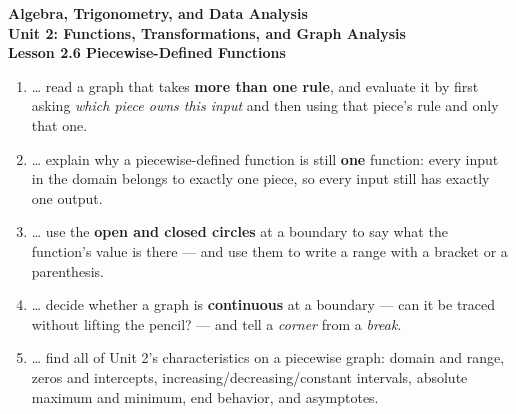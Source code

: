 \documentclass[10pt]{article}
\begin{document}
\vspace{-0.8in}

\begin{center}
  {\color{white}\textbf{\LARGE Algebra, Trigonometry, and Data Analysis}}\\[4pt]
  {\color{mistmid}\large\textbf{Unit 2: Functions, Transformations, and Graph Analysis}}\\[6pt]
  {\color{white}\textbf{\large Lesson 2.6 \quad Piecewise-Defined Functions}}
\end{center}

\vspace{0.22in}
\namedateperiod
\vspace{0.18in}

\begin{learningtargetbox}
\small
\begin{enumerate}[leftmargin=1.5em, itemsep=5pt]
  \item \ldots{} read a graph that takes \textbf{more than one rule}, and evaluate it by first asking
        \emph{which piece owns this input} and then using that piece's rule and only that one.
  \item \ldots{} explain why a piecewise-defined function is still \textbf{one} function: every input
        in the domain belongs to exactly one piece, so every input still has exactly one output.
  \item \ldots{} use the \textbf{open and closed circles} at a boundary to say what the function's
        value is there --- and use them to write a range with a bracket or a parenthesis.
  \item \ldots{} decide whether a graph is \textbf{continuous} at a boundary --- can it be traced
        without lifting the pencil? --- and tell a \emph{corner} from a \emph{break}.
  \item \ldots{} find all of Unit 2's characteristics on a piecewise graph: domain and range, zeros
        and intercepts, increasing/decreasing/constant intervals, absolute maximum and minimum, end
        behavior, and asymptotes.
\end{enumerate}
\end{learningtargetbox}

\vspace{0.14in}
\end{document}
